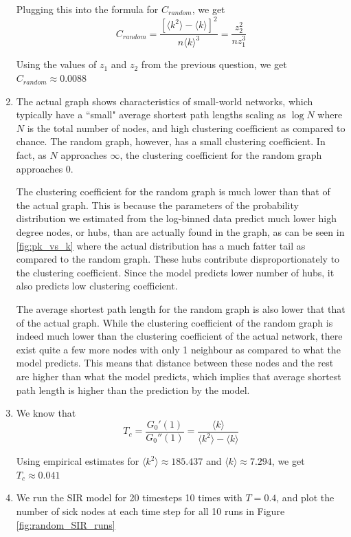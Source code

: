 \documentclass{article}
\begin{document}
\begin{enumerate}
Plugging this into the formula for $C_{random}$, we get $$C_{random} = \frac{[\langle k^2 \rangle - \langle k \rangle]^2}{n\langle k \rangle^3} = \frac{z_2^2}{n z_1^3}$$

Using the values of $z_1$ and $z_2$ from the previous question, we get $C_{random} \approx 0.0088$

\item The actual graph shows characteristics of small-world networks, which typically have a ``small" average shortest path lengths scaling as $\log N$ where $N$ is the total number of nodes, and high clustering coefficient as compared to chance. The random graph, however, has a small clustering coefficient. In fact, as $N$ approaches $\infty$, the clustering coefficient for the random graph approaches $0$. 

The clustering coefficient for the random graph is much lower than that of the actual graph. This is because the parameters of the probability distribution we estimated from the log-binned data predict much lower high degree nodes, or hubs, than are actually found in the graph, as can be seen in \ref{fig:pk_vs_k} where the actual distribution has a much fatter tail as compared to the random graph. These hubs contribute disproportionately to the clustering coefficient. Since the model predicts lower number of hubs, it also predicts low clustering coefficient.

The average shortest path length for the random graph is also lower that that of the actual graph. While the clustering coefficient of the random graph is indeed much lower than the clustering coefficient of the actual network, there exist quite a few more nodes with only 1 neighbour as compared to what the model predicts. This means that distance between these nodes and the rest are higher than what the model predicts, which implies that average shortest path length is higher than the prediction by the model. 

\item We know that $$T_c = \frac{G_0'(1)}{G_0''(1)} = \frac{\langle k \rangle }{\langle k^2 \rangle - \langle k \rangle }$$

Using empirical estimates for  $\langle k^2 \rangle \approx 185.437$ and $\langle k \rangle \approx 7.294$, we get $T_c \approx 0.041$

\item We run the SIR model for 20 timesteps 10 times with $T=0.4$, and plot the number of sick nodes at each time step for all 10 runs in Figure \ref{fig:random_SIR_runs}


\end{enumerate}
\end{document}
